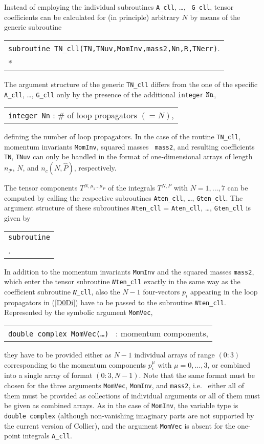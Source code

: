 \documentclass[preprint,sort&compress,12pt]{elsarticle}
\makeatletter
\def\bce{\begin{center}}
\def\ece{\end{center}}
\def\refeq#1{\mbox{(\ref{#1})}}
\def\ie{i.e.\ }
\newcommand{\collier}{{\sc Collier}}
\newcommand{\nTn}{{\tt Nn}}
\newlength{\parwidth}\newlength{\colonewidth}%
\newcommand{\cpcsub}[1]
{%
\setlength{\parwidth}{\textwidth}\addtolength{\parwidth}{-2.1em}%
\bce
\begin{tabular}[t]{@{}p{\parwidth}@{}}
#1
\end{tabular}
\ece
}%
\makeatother
\begin{document}
Instead of employing the individual subroutines {\tt A\_cll}, \ldots, {\tt
  G\_cll}, tensor coefficients can be calculated for (in principle)
arbitrary $N$ by means of the generic subroutine
\cpcsub{
{\tt subroutine  TN\_cll(TN,TNuv,MomInv,mass2,\nTn,R,TNerr)}\;.\\*
}
The argument structure of the generic {\tt TN\_cll} differs from the
one of the specific {\tt A\_cll}, \ldots, {\tt G\_cll} only by the presence
of the additional {\tt integer} $\nTn$,
\cpcsub{
  {\tt integer \nTn} : \# of loop propagators $(=N)$\;, 
}
defining the number of loop propagators. In the case of the routine
{\tt TN\_cll}, momentum invariants {\tt MomInv}, squared masses {\tt
  mass2}, and resulting coefficients {\tt TN}, {\tt TNuv} can only be
handled in the format of one-dimensional arrays of length
$n_\mathcal{P}$, $N$,
and $n_c(N,\widehat{P})$, respectively.

\begin{sloppypar}
The tensor 
components $T^{N,\mu_1\dots \mu_P}$ of the integrals $T^{N,P}$ with
$N=1,\ldots,7$ can be computed by calling the respective subroutines
{\tt Aten\_cll}, \ldots, {\tt Gten\_cll}. The argument structure of
these subroutines
{\tt {\it N}ten\_cll} = {\tt Aten\_cll}, \ldots, {\tt Gten\_cll} is given by
\cpcsub{
{\tt subroutine}  \\ \qquad {\tt {\it N}ten\_cll(TNten,TNtenuv,MomVec,MomInv,mass2,R,TNtenerr)}\;.\\
}
In addition to the momentum invariants {\tt MomInv} and the squared masses {\tt mass2}, which enter the tensor subroutine {\tt {\it N}ten\_cll} 
exactly in the same way as the coefficient subroutine {\tt {\it N}\_cll}, also the $N-1$ four-vectors $p_i$ 
appearing in the 
loop propagators in \refeq{D0Di} have to be passed to the subroutine {\tt {\it N}ten\_cll}. 
Represented by the symbolic argument {\tt MomVec}, 
\cpcsub{
  {\tt double complex MomVec(\ldots) } : momentum components\;, 
}
they have to be provided either as $N-1$ individual arrays of range
\mbox{$(0\!:\!3)$} corresponding to the momentum components $p_i^\mu$ with
$\mu=0, \ldots, 3$, or combined into a single array of format
$(0\!:\!3,N-1)$.  Note that the same format must be chosen for the
three arguments {\tt MomVec}, {\tt MomInv}, 
and {\tt mass2}, \ie
either all of them must be provided as collections of individual
arguments or all of them must be given as combined arrays. As in the
case of {\tt MomInv}, the variable type is {\tt double complex}
(although non-vanishing imaginary parts are not supported by the
current version of
{\collier}), and the argument {\tt MomVec} is absent for the
one-point integrals {\tt A\_cll}.
\end{sloppypar}
\end{document}
